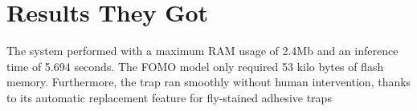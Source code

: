 \documentclass[../../main]{subfiles}
\begin{document}
\section{Results They Got} \label{sec:}

The system performed with a maximum RAM usage of 2.4Mb and an inference time of
5.694 seconds. The FOMO model only required 53 kilo bytes of flash memory.
Furthermore, the trap ran smoothly without human intervention, thanks to its
automatic replacement feature for fly-stained adhesive traps
\end{document}
